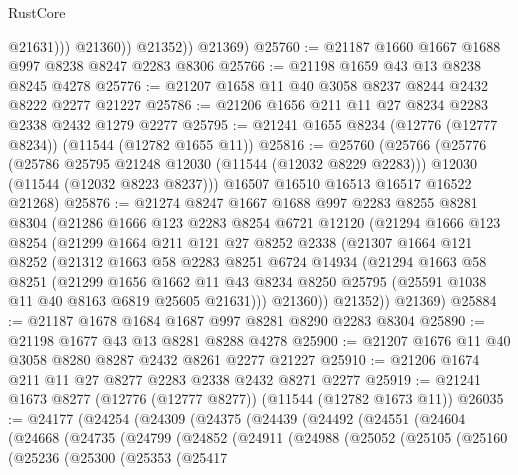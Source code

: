 \begin{lexlean}{RustCore}
\begin{coremodule}
                    @21631)))
              @21360))
          @21352))
      @21369)
@25760 := @21187 @1660 @1667 @1688 @997 @8238 @8247 @2283 @8306
@25766 := @21198 @1659 @43 @13 @8238 @8245 @4278
@25776 := @21207 @1658 @11 @40 @3058 @8237 @8244 @2432 @8222 @2277 @21227
@25786 := @21206 @1656 @211 @11 @27 @8234 @2283 @2338 @2432 @1279 @2277
@25795 := @21241 @1655 @8234 (@12776 (@12777 @8234)) (@11544 (@12782 @1655 @11))
@25816 := @25760
    (@25766
      (@25776
        (@25786 @25795 @21248 @12030 (@11544 (@12032 @8229 @2283)))
        @12030
        (@11544 (@12032 @8223 @8237)))
      @16507
      @16510
      @16513
      @16517
      @16522
      @21268)
@25876 := @21274
    @8247
    @1667
    @1688
    @997
    @2283
    @8255
    @8281
    @8304
    (@21286
      @1666
      @123
      @2283
      @8254
      @6721
      @12120
      (@21294
        @1666
        @123
        @8254
        (@21299
          @1664
          @211
          @121
          @27
          @8252
          @2338
          (@21307
            @1664
            @121
            @8252
            (@21312
              @1663
              @58
              @2283
              @8251
              @6724
              @14934
              (@21294
                @1663
                @58
                @8251
                (@21299
                  @1656
                  @1662
                  @11
                  @43
                  @8234
                  @8250
                  @25795
                  (@25591 @1038 @11 @40 @8163 @6819 @25605 @21631)))
              @21360))
          @21352))
      @21369)
@25884 := @21187 @1678 @1684 @1687 @997 @8281 @8290 @2283 @8304
@25890 := @21198 @1677 @43 @13 @8281 @8288 @4278
@25900 := @21207 @1676 @11 @40 @3058 @8280 @8287 @2432 @8261 @2277 @21227
@25910 := @21206 @1674 @211 @11 @27 @8277 @2283 @2338 @2432 @8271 @2277
@25919 := @21241 @1673 @8277 (@12776 (@12777 @8277)) (@11544 (@12782 @1673 @11))
@26035 := @24177
    (@24254
      (@24309
        (@24375
          (@24439
            (@24492
              (@24551
                (@24604
                  (@24668
                    (@24735
                      (@24799
                        (@24852
                          (@24911
                            (@24988
                              (@25052
                                (@25105
                                  (@25160
                                    (@25236
                                      (@25300
                                        (@25353
                                          (@25417

\end{coremodule}
\end{lexlean}
